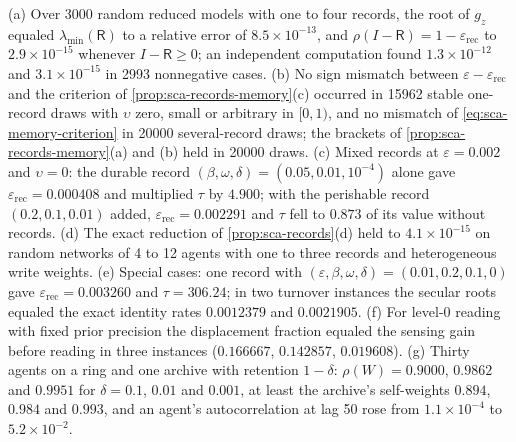 \begin{numcheck}\label{chk:sca-records}
(a) Over 3000 random reduced models with one to four records, the root of $g_z$ equaled $\lambda_{\min}(\mathsf R)$ to a relative error of $8.5\times10^{-13}$, and $\rho(I-\mathsf R)=1-\varepsilon_{\mathrm{rec}}$ to $2.9\times10^{-15}$ whenever $I-\mathsf R\ge0$; an independent computation found $1.3\times10^{-12}$ and $3.1\times10^{-15}$ in 2993 nonnegative cases. (b) No sign mismatch between $\varepsilon-\varepsilon_{\mathrm{rec}}$ and the criterion of \cref{prop:sca-records-memory}(c) occurred in 15962 stable one-record draws with $\upsilon$ zero, small or arbitrary in $[0,1)$, and no mismatch of \eqref{eq:sca-memory-criterion} in 20000 several-record draws; the brackets of \cref{prop:sca-records-memory}(a) and (b) held in 20000 draws. (c) Mixed records at $\varepsilon=0.002$ and $\upsilon=0$: the durable record $(\beta,\omega,\delta)=(0.05,0.01,10^{-4})$ alone gave $\varepsilon_{\mathrm{rec}}=0.000408$ and multiplied $\tau$ by $4.900$; with the perishable record $(0.2,0.1,0.01)$ added, $\varepsilon_{\mathrm{rec}}=0.002291$ and $\tau$ fell to $0.873$ of its value without records. (d) The exact reduction of \cref{prop:sca-records}(d) held to $4.1\times10^{-15}$ on random networks of 4 to 12 agents with one to three records and heterogeneous write weights. (e) Special cases: one record with $(\varepsilon,\beta,\omega,\delta)=(0.01,0.2,0.1,0)$ gave $\varepsilon_{\mathrm{rec}}=0.003260$ and $\tau=306.24$; in two turnover instances the secular roots equaled the exact identity rates $0.0012379$ and $0.0021905$. (f) For level-0 reading with fixed prior precision the displacement fraction equaled the sensing gain before reading in three instances ($0.166667$, $0.142857$, $0.019608$). (g) Thirty agents on a ring and one archive with retention $1-\delta$: $\rho(W)=0.9000$, $0.9862$ and $0.9951$ for $\delta=0.1$, $0.01$ and $0.001$, at least the archive's self-weights $0.894$, $0.984$ and $0.993$, and an agent's autocorrelation at lag 50 rose from $1.1\times10^{-4}$ to $5.2\times10^{-2}$.
\end{numcheck}

